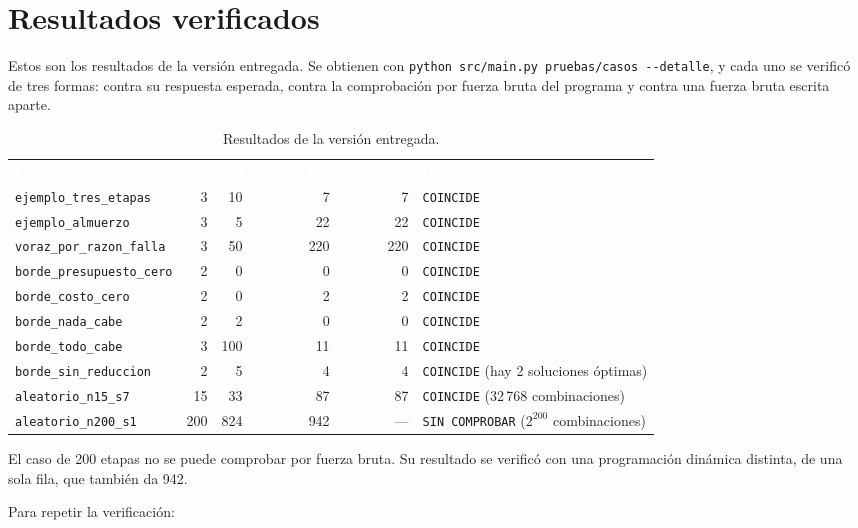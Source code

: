 \documentclass[11pt,a4paper]{article}
\newcommand{\cod}[1]{\texttt{#1}}
\newcommand{\encabezado}{\rowcolor{fondo}}
\newcommand{\blanco}[1]{\textcolor{white}{\textbf{#1}}}
\begin{document}
\section{Resultados verificados}
\label{sec:verificados}

Estos son los resultados de la versión entregada. Se obtienen con \cod{python src/main.py pruebas/casos -{}-detalle}, y cada uno se verificó de tres formas: contra su respuesta esperada, contra la comprobación por fuerza bruta del programa y contra una fuerza bruta escrita aparte.

\begin{table}[H]
\centering\small
\renewcommand{\arraystretch}{1.2}
\begin{tabularx}{\textwidth}{@{}lrrrrX@{}}
\encabezado \blanco{Caso} & \blanco{$n$} & \blanco{$B$} & \blanco{Reducción} & \blanco{Esperada} & \blanco{Comprobación por fuerza bruta} \\
\cod{ejemplo\_tres\_etapas} & 3 & 10 & 7 & 7 & \cod{COINCIDE} \\
\cod{ejemplo\_almuerzo} & 3 & 5 & 22 & 22 & \cod{COINCIDE} \\
\cod{voraz\_por\_razon\_falla} & 3 & 50 & 220 & 220 & \cod{COINCIDE} \\
\cod{borde\_presupuesto\_cero} & 2 & 0 & 0 & 0 & \cod{COINCIDE} \\
\cod{borde\_costo\_cero} & 2 & 0 & 2 & 2 & \cod{COINCIDE} \\
\cod{borde\_nada\_cabe} & 2 & 2 & 0 & 0 & \cod{COINCIDE} \\
\cod{borde\_todo\_cabe} & 3 & 100 & 11 & 11 & \cod{COINCIDE} \\
\cod{borde\_sin\_reduccion} & 2 & 5 & 4 & 4 & \cod{COINCIDE} (hay 2 soluciones óptimas) \\
\cod{aleatorio\_n15\_s7} & 15 & 33 & 87 & 87 & \cod{COINCIDE} (32\,768 combinaciones) \\
\cod{aleatorio\_n200\_s1} & 200 & 824 & 942 & --- & \cod{SIN COMPROBAR} ($2^{200}$ combinaciones) \\
\bottomrule
\end{tabularx}
\caption{Resultados de la versión entregada.}
\end{table}

El caso de 200 etapas no se puede comprobar por fuerza bruta. Su resultado se verificó con una programación dinámica distinta, de una sola fila, que también da 942.

Para repetir la verificación:
\end{document}
